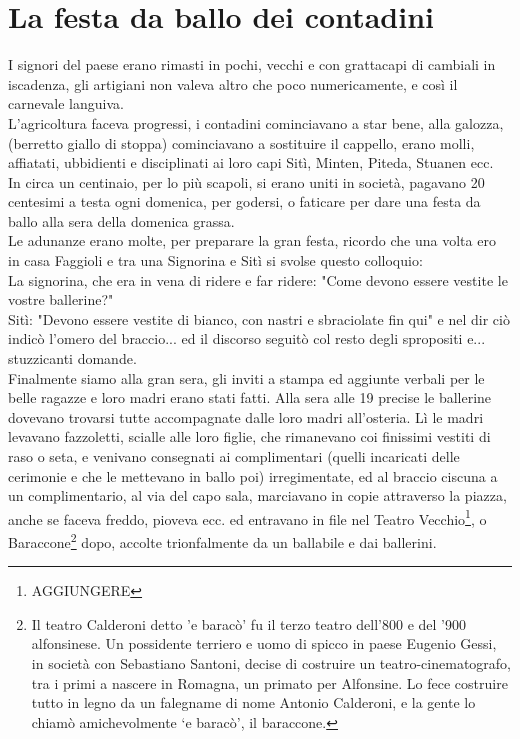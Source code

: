 \documentclass[10pt]{memoir} %
\begin{document}
\chapter{La festa da ballo dei contadini}
I signori del paese erano rimasti in pochi, vecchi e con grattacapi di cambiali in iscadenza, gli artigiani non valeva altro che poco numericamente, e così il carnevale languiva. \\
L'agricoltura faceva progressi, i contadini cominciavano a star bene, alla galozza, (berretto giallo di stoppa) cominciavano a sostituire il cappello, erano molli, affiatati, ubbidienti e disciplinati ai loro capi Sitì, Minten, Piteda, Stuanen ecc.\\
In circa un centinaio, per lo più scapoli, si erano uniti in società, pagavano 20 centesimi a testa ogni domenica, per godersi, o faticare per dare una festa da ballo alla sera della domenica grassa. \\
Le adunanze erano molte, per preparare la gran festa, ricordo che una volta ero in casa Faggioli e tra una Signorina e Sitì si svolse questo colloquio:\\
La signorina, che era in vena di ridere e far ridere: "Come devono essere vestite le vostre ballerine?"\\
Sitì: "Devono essere vestite di bianco, con nastri e sbraciolate fin qui" e nel dir ciò indicò l'omero del braccio... ed il discorso seguitò col resto degli spropositi e... stuzzicanti domande.\\
Finalmente siamo alla gran sera, gli inviti a stampa ed aggiunte verbali per le belle ragazze e loro madri erano stati fatti. Alla sera alle 19 precise le ballerine dovevano trovarsi tutte accompagnate dalle loro madri all'osteria. Lì le madri levavano fazzoletti, scialle alle loro figlie, che rimanevano coi finissimi vestiti di raso o seta, e venivano consegnati ai complimentari (quelli incaricati delle cerimonie e che le mettevano in ballo poi) irregimentate, ed al braccio ciscuna a un complimentario, al via del capo sala, marciavano in copie attraverso la piazza, anche se faceva freddo, pioveva ecc. ed entravano in file nel Teatro Vecchio\footnote{AGGIUNGERE}, o Baraccone\footnote{Il teatro Calderoni detto 'e baracò' fu il terzo teatro dell'800 e del '900 alfonsinese. Un possidente terriero e uomo di spicco in paese Eugenio Gessi, in società con Sebastiano Santoni, decise di costruire un teatro-cinematografo, tra i primi a nascere in Romagna, un primato per Alfonsine. Lo fece costruire tutto in legno da un falegname di nome Antonio Calderoni, e la gente lo chiamò amichevolmente ‘e baracò’, il baraccone.} dopo, accolte trionfalmente da un ballabile e dai ballerini.\\
\end{document}
